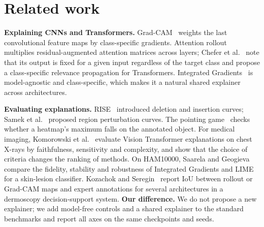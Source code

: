\section{Related work}
\label{sec:related}

\textbf{Explaining CNNs and Transformers.} Grad-CAM~\cite{selvaraju2017gradcam} weights the last
convolutional feature maps by class-specific gradients. Attention rollout~\cite{abnar2020attention}
multiplies residual-augmented attention matrices across layers; Chefer et al.~\cite{chefer2021transformer}
note that its output is fixed for a given input regardless of the target class and propose a
class-specific relevance propagation for Transformers. Integrated Gradients~\cite{sundararajan2017axiomatic}
is model-agnostic and class-specific, which makes it a natural shared explainer across architectures.

\textbf{Evaluating explanations.} RISE~\cite{petsiuk2018rise} introduced deletion and insertion curves;
Samek et al.~\cite{samek2017evaluating} proposed region perturbation curves. The pointing
game~\cite{zhang2016topdown} checks whether a heatmap's maximum falls on the annotated object. For medical
imaging, Komorowski et al.~\cite{komorowski2023towards} evaluate Vision Transformer explanations on chest
X-rays by faithfulness, sensitivity and complexity, and show that the choice of criteria changes the
ranking of methods. On HAM10000, Saarela and Geogieva~\cite{saarela2022robustness} compare the fidelity,
stability and robustness of Integrated Gradients and LIME for a skin-lesion classifier.
Kozachok and Seregin~\cite{kozachok2026melanoscope} report IoU between rollout or Grad-CAM maps and expert
annotations for several architectures in a dermoscopy decision-support system.
\textbf{Our difference.} We do not propose a new explainer; we add model-free controls and a shared
explainer to the standard benchmarks and report all axes on the same checkpoints and seeds.
